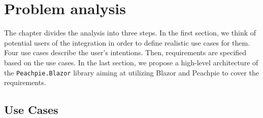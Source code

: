 \chapter{Problem analysis}
The chapter divides the analysis into three steps.
In the first section, we think of potential users of the integration in order to define realistic use cases for them.
Four use cases describe the user's intentions.
Then, requirements are specified based on the use cases.
In the last section, we propose a high-level architecture of the \texttt{Peachpie.Blazor} library aiming at utilizing Blazor and Peachpie to cover the requirements.

\section{Use Cases}

